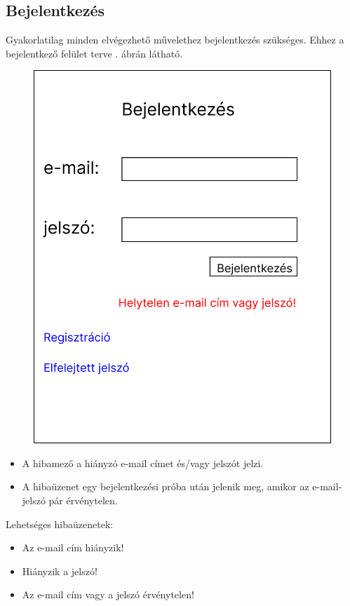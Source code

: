 \documentclass[a4paper,12pt]{article}
\begin{document}
\subsection{Bejelentkezés}

Gyakorlatilag minden elvégezhető művelethez bejelentkezés szükséges. Ehhez a bejelentkező felület terve . ábrán látható.

\begin{figure}
	\centering
	\includegraphics[width=\textwidth]{images/Web_pages/Login.jpg}
	\caption{}
	\label{fig:Login}
\end{figure}

\begin{itemize}
	\item A hibamező a hiányzó e-mail címet és/vagy jelszót jelzi.
	\item A hibaüzenet egy bejelentkezési próba után jelenik meg, amikor az e-mail-jelszó pár érvénytelen.
\end{itemize}

Lehetséges hibaüzenetek:
\begin{itemize}
	\item Az e-mail cím hiányzik!
	\item Hiányzik a jelszó!
	\item Az e-mail cím vagy a jelszó érvénytelen!
\end{itemize}
\end{document}
